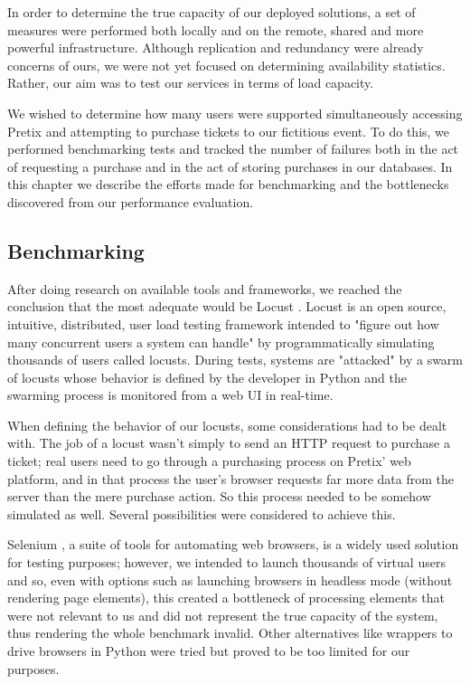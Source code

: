 \documentclass[12pt]{article}
\begin{document}
In order to determine the true capacity of our deployed solutions, a set of measures were performed both locally and on the remote, shared and more powerful 
infrastructure.
Although replication and redundancy were already concerns of ours, we were not yet focused on determining availability statistics.
Rather, our aim was to test our services in terms of load capacity.

We wished to determine how many users were supported simultaneously accessing Pretix and attempting to purchase tickets to our fictitious event.
To do this, we performed benchmarking tests and tracked the number of failures both in the act of requesting a purchase and in the act of storing purchases in 
our databases.
In this chapter we describe the efforts made for benchmarking and the bottlenecks discovered from our performance evaluation.

\subsection{Benchmarking} \label{performance.benchmarking} %


After doing research on available tools and frameworks, we reached the conclusion that the most adequate would be Locust \cite{locust}.
Locust is an open source, intuitive, distributed, user load testing framework intended to "figure out how many concurrent users a system can handle" by 
programmatically simulating thousands of users called locusts.
During tests, systems are "attacked" by a swarm of locusts whose behavior is defined by the developer in Python and the swarming process is monitored from a 
web UI in real-time. 

When defining the behavior of our locusts, some considerations had to be dealt with.
The job of a locust wasn't simply to send an HTTP request to purchase a ticket; real users need to go through a purchasing process on Pretix' web platform, and 
in that process the user's browser requests far more data from the server than the mere purchase action.
So this process needed to be somehow simulated as well.
Several possibilities were considered to achieve this.

Selenium \cite{selenium}, a suite of tools for automating web browsers, is a widely used solution for testing purposes; however, we intended to launch thousands 
of virtual users and so, even with options such as launching browsers in headless mode (without rendering page elements), this created a bottleneck of processing 
elements that were not relevant to us and did not represent the true capacity of the system, thus rendering the whole benchmark invalid.
Other alternatives like wrappers to drive browsers in Python were tried but proved to be too limited for our purposes.
\end{document}
